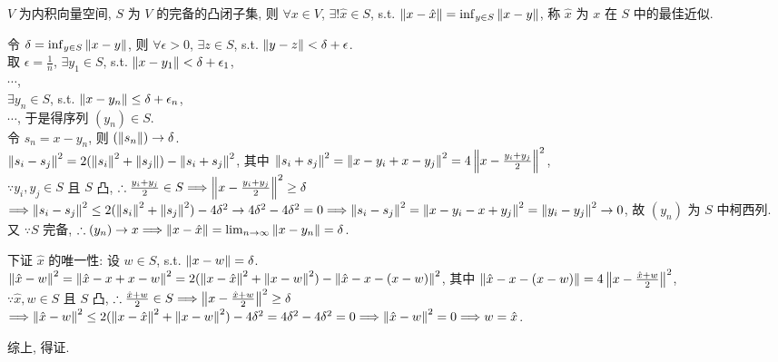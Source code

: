 \documentclass{note}
\begin{document}
\begin{thm}[(课本定理 13.9)]\label{thm-13.9}
    $V$ 为内积向量空间, $S$ 为 $V$ 的完备的凸闭子集, 则 $\forall x\in V$, $\exists!\hat{x}\in S$, s.t. $\left\lVert x-\hat{x}\right\rVert=\inf_{y\in S}\left\lVert x-y\right\rVert$, 称 $\hat{x}$ 为 $x$ 在 $S$ 中的最佳近似.
\end{thm}
\begin{pf}
    令 $\delta=\inf_{y\in S}\left\lVert x-y\right\rVert$, 则 $\forall\epsilon>0$, $\exists z\in S$, s.t. $\left\lVert y-z\right\rVert<\delta+\epsilon$.\\
    取 $\epsilon=\frac{1}{n}$, $\exists y_1\in S$, s.t. $\left\lVert x-y_1\right\rVert<\delta+\epsilon_1$,\\
    $\cdots$,\\
    $\exists y_n\in S$, s.t. $\left\lVert x-y_n\right\rVert\leq\delta+\epsilon_n$,\\
    $\cdots$, 于是得序列 $(y_n)\in S$.\\
    令 $s_n=x-y_n$, 则 $(\left\lVert s_n\right\rVert)\rightarrow\delta$.\\
    $\left\lVert s_i-s_j\right\rVert^2=2(\left\lVert s_i\right\rVert^2+\left\lVert s_j\right\rVert)-\left\lVert s_i+s_j\right\rVert^2$, 其中 $\left\lVert s_i+s_j\right\rVert^2=\left\lVert x-y_i+x-y_j\right\rVert^2=4\left\lVert x-\frac{y_i+y_j}{2}\right\rVert^2$,\\
    $\because y_i,y_j\in S$ 且 $S$ 凸, $\therefore\frac{y_i+y_j}{2}\in S\Longrightarrow\left\lVert x-\frac{y_i+y_j}{2}\right\rVert^2\geq\delta$\\
    $\Longrightarrow\left\lVert s_i-s_j\right\rVert^2\leq 2(\left\lVert s_i\right\rVert^2+\left\lVert s_j\right\rVert^2)-4\delta^2\rightarrow 4\delta^2-4\delta^2=0\Longrightarrow\left\lVert s_i-s_j\right\rVert^2=\left\lVert x-y_i-x+y_j\right\rVert^2=\left\lVert y_i-y_j\right\rVert^2\rightarrow 0$, 故 $(y_n)$ 为 $S$ 中柯西列.\\
    又 $\because S$ 完备, $\therefore(y_n)\rightarrow x\Longrightarrow\left\lVert x-\hat{x}\right\rVert=\lim_{n\rightarrow\infty}\left\lVert x-y_n\right\rVert=\delta$.

    下证 $\hat{x}$ 的唯一性: 设 $w\in S$, s.t. $\left\lVert x-w\right\rVert=\delta$.\\
    $\left\lVert\hat{x}-w\right\rVert^2=\left\lVert\hat{x}-x+x-w\right\rVert^2=2(\left\lVert x-\hat{x}\right\rVert^2+\left\lVert x-w\right\rVert^2)-\left\lVert\hat{x}-x-(x-w)\right\rVert^2$, 其中 $\left\lVert\hat{x}-x-(x-w)\right\rVert=4\left\lVert x-\frac{\hat{x}+w}{2}\right\rVert^2$,\\
    $\because\hat{x},w\in S$ 且 $S$ 凸, $\therefore\frac{\hat{x}+w}{2}\in S\Longrightarrow\left\lVert x-\frac{\hat{x}+w}{2}\right\rVert^2\geq\delta$\\
    $\Longrightarrow\left\lVert\hat{x}-w\right\rVert^2\leq 2(\left\lVert x-\hat{x}\right\rVert^2+\left\lVert x-w\right\rVert^2)-4\delta^2=4\delta^2-4\delta^2=0\Longrightarrow\left\lVert\hat{x}-w\right\rVert^2=0\Longrightarrow w=\hat{x}$.

    综上, 得证.
\end{pf}
\end{document}
